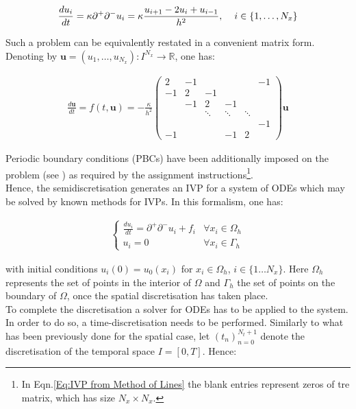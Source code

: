 \documentclass[11pt]{article}
\theoremstyle{theorem}
\theoremstyle{definition}
\begin{document}
\begin{align*}
	\frac{du_i}{dt} = \kappa \partial^+\partial^- u_i = \kappa\frac{u_{i+1} - 2u_i + u_{i-1}}{h^2},\hspace{4mm} i\in\lbrace 1,\ldots, N_x\rbrace
\end{align*}

Such a problem can be equivalently restated in a convenient matrix form. Denoting by $ \mathbf{u} = (u_1,\ldots,u_{N_x}) : I^{N_x} \to \mathbb{R} $, one has:

\begin{align}\label{Eq:IVP from Method of Lines}
\frac{d\mathbf{u}}{dt} = f(t,\mathbf{u}) = -\frac{\kappa}{h^2}
\begin{pmatrix}
2 & -1 & & & & -1\\
-1 & 2 & -1 & & & \\
& -1 & 2 & -1 & & \\
& & \ddots & \ddots & \ddots & \\
& & & & & -1 \\
-1 & & & -1 & 2
\end{pmatrix}
\mathbf{u} 
\end{align}

Periodic boundary conditions (PBCs) have been additionally imposed on the problem (see \cite{lec-notes}) as required by the assignment instructions\footnote{In Eqn.\eqref{Eq:IVP from Method of Lines} the blank entries represent zeros of tre matrix, which has size $N_x\times N_x$.}.\\
Hence, the semidiscretisation generates an IVP for a system of ODEs which may be solved by known methods for IVPs. In this formalism, one has:


\begin{align}
\label{eqn:lines}
\begin{cases}
	\frac{du_i}{dt}=\partial^+\partial^-u_i+f_i &\forall x_i\in\Omega_h\\
	u_i=0 &\forall x_i\in\Gamma_h
\end{cases}
\end{align} 

with initial conditions $u_i(0)=u_0(x_i)$ for $x_i\in\Omega_h$, $i\in\lbrace 1\ldots N_x\rbrace$. Here $\Omega_h$ represents the set of points in the interior of $\Omega$ and $\Gamma_h$ the set of points on the boundary of $\Omega$, once the spatial discretisation has taken place.\\
To complete the discretisation a solver for ODEs has to be applied to the system. In order to do so, a time-discretisation needs to be performed. Similarly to what has been previously done for the spatial case, let $ (t_n)_{n = 0}^{N_t + 1} $ denote the discretisation of the temporal space $ I = [0,T] $. Hence:
\end{document}

